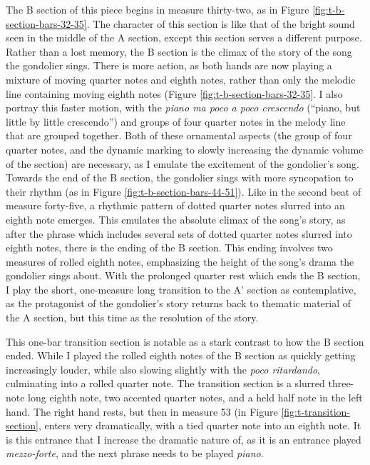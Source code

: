 The B section of this piece begins in measure thirty-two, as in Figure \ref{fig:t-b-section-bars-32-35}\autocite{Henle_2002}. The character of this section is like that of the bright sound seen in the middle of the A section, except this section serves a different purpose. Rather than a lost memory, the B section is the climax of the story of the song the gondolier sings. There is more action, as both hands are now playing a mixture of moving quarter notes and eighth notes, rather than only the melodic line containing moving eighth notes (Figure \ref{fig:t-b-section-bars-32-35}\autocite{Henle_2002}. I also portray this faster motion, with the \textit{piano ma poco a poco crescendo} (``piano, but little by little crescendo'') and groups of four quarter notes in the melody line that are grouped together. Both of these ornamental aspects (the group of four quarter notes, and the dynamic marking to slowly increasing the dynamic volume of the section) are necessary, as I emulate the excitement of the gondolier's song. Towards the end of the B section, the gondolier sings with more syncopation to their rhythm (as in Figure \ref{fig:t-b-section-bars-44-51}\autocite{Henle_2002}). Like in the second beat of measure forty-five, a rhythmic pattern of dotted quarter notes slurred into an eighth note emerges. This emulates the absolute climax of the song's story, as after the phrase which includes several sets of dotted quarter notes slurred into eighth notes, there is the ending of the B section. This ending involves two measures of rolled eighth notes, emphasizing the height of the song's drama the gondolier sings about. With the prolonged quarter rest which ends the B section, I play the short, one-measure long transition to the A' section as contemplative, as the protagonist of the gondolier's story returns back to thematic material of the A section, but this time as the resolution of the story.

This one-bar transition section is notable as a stark contrast to how the B section ended. While I played the rolled eighth notes of the B section as quickly getting increasingly louder, while also slowing slightly with the \textit{poco ritardando}, culminating into a rolled quarter note. The transition section is a slurred three-note long eighth note, two accented quarter notes, and a held half note in the left hand. The right hand rests, but then in measure 53 (in Figure \ref{fig:t-transition-section}\autocite{Henle_2002}, enters very dramatically, with a tied quarter note into an eighth note. It is this entrance that I increase the dramatic nature of, as it is an entrance played \textit{mezzo-forte}, and the next phrase needs to be played \textit{piano}.

